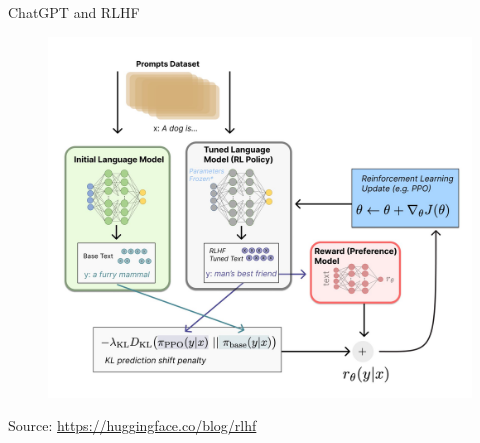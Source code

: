\documentclass[handout]{beamer}
\begin{document}
\begin{frame}{ChatGPT and RLHF}

\begin{scriptsize}



 \begin{figure}[h]
        	\includegraphics[scale = 0.12]{pics/RLHF.png}
        \end{figure}
        Source: \url{https://huggingface.co/blog/rlhf}


\end{scriptsize}



\end{frame}
\end{document}
